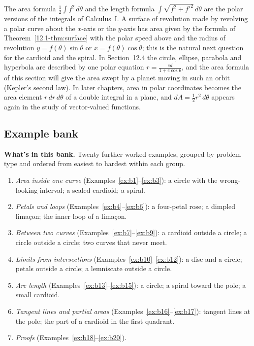 \documentclass[11pt]{article}
\begin{document}
The area formula $\frac12\int f^2\,d\theta$ and the length formula $\int\sqrt{f^2+f'^2}\,d\theta$ are the polar versions of the integrals of Calculus~I. A surface of revolution made by revolving a polar curve about the $x$-axis or the $y$-axis has area given by the formula of Theorem~\ref{12.1-thm:surface} with the polar speed above and the radius of revolution $y=f(\theta)\sin\theta$ or $x=f(\theta)\cos\theta$; this is the natural next question for the cardioid and the spiral. In Section~12.4 the circle, ellipse, parabola and hyperbola are described by one polar equation $r=\frac{ed}{1+e\cos\theta}$, and the area formula of this section will give the area swept by a planet moving in such an orbit (Kepler's second law). In later chapters, area in polar coordinates becomes the area element $r\,dr\,d\theta$ of a double integral in a plane, and $dA=\frac12r^2\,d\theta$ appears again in the study of vector-valued functions.

\subsection*{Example bank}

\textbf{What's in this bank.} Twenty further worked examples, grouped by problem type and ordered from easiest to hardest within each group.
\begin{enumerate}[nosep]
  \item \emph{Area inside one curve} (Examples~\ref{ex:b1}--\ref{ex:b3}): a circle with the wrong-looking interval; a scaled cardioid; a spiral.
  \item \emph{Petals and loops} (Examples~\ref{ex:b4}--\ref{ex:b6}): a four-petal rose; a dimpled limaçon; the inner loop of a limaçon.
  \item \emph{Between two curves} (Examples~\ref{ex:b7}--\ref{ex:b9}): a cardioid outside a circle; a circle outside a circle; two curves that never meet.
  \item \emph{Limits from intersections} (Examples~\ref{ex:b10}--\ref{ex:b12}): a disc and a circle; petals outside a circle; a lemniscate outside a circle.
  \item \emph{Arc length} (Examples~\ref{ex:b13}--\ref{ex:b15}): a circle; a spiral toward the pole; a small cardioid.
  \item \emph{Tangent lines and partial areas} (Examples~\ref{ex:b16}--\ref{ex:b17}): tangent lines at the pole; the part of a cardioid in the first quadrant.
  \item \emph{Proofs} (Examples~\ref{ex:b18}--\ref{ex:b20}).
\end{enumerate}
\end{document}
